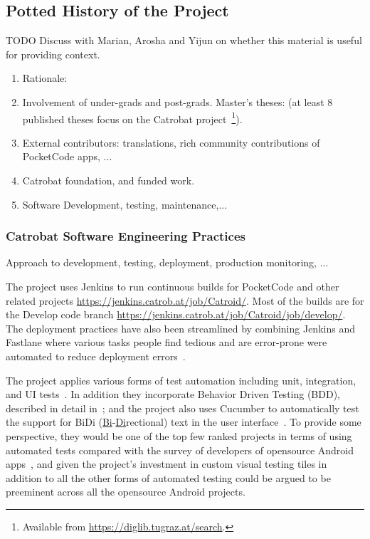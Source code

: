 \subsection{Potted History of the Project}
TODO Discuss with Marian, Arosha and Yijun on whether this material is useful for providing context.
\begin{enumerate}
    \item Rationale:
    \item Involvement of under-grads and post-grads. Master's theses: (at least 8 published theses focus on the Catrobat project~\footnote{Available from \url{https://diglib.tugraz.at/search}.}).
    \item External contributors: translations, rich community contributions of PocketCode apps, ...
    \item Catrobat foundation, and funded work.
    \item Software Development, testing, maintenance,...
\end{enumerate}

\subsubsection{Catrobat Software Engineering Practices}
Approach to development, testing, deployment, production monitoring, ...

The project uses Jenkins to run continuous builds for PocketCode and other related projects \url{https://jenkins.catrob.at/job/Catroid/}. Most of the builds are for the Develop code branch \url{https://jenkins.catrob.at/job/Catroid/job/develop/}. The deployment practices have also been streamlined by combining Jenkins and Fastlane where various tasks people find tedious and are error-prone were automated to reduce deployment errors~\citep{luhana2018streamlining}.

The project applies various forms of test automation including unit, integration, and UI tests~\citep{luhana2018streamlining}. In addition they incorporate Behavior Driven Testing (BDD), described in detail in~\citep{ali2019using_catrobat}; and the project also uses Cucumber to automatically test the support for BiDi (\underline{Bi}-\underline{Di}rectional) text in the user interface~\citep{ayyal2016automated_bidi_testing, awwad2017_automated_bidi_testing, ali2019behavior_catrobat}. To provide some perspective, they would be one of the top few ranked projects in terms of using automated tests compared with the survey of developers of opensource Android apps~\citep{linares2017_how_do_developers_test_android_apps}, and given the project's investment in custom visual testing tiles in addition to all the other forms of automated testing could be argued to be preeminent across all the opensource Android projects. 



